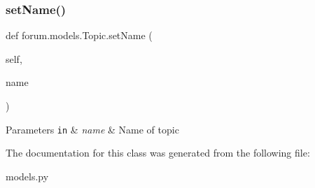 \subsubsection{\texorpdfstring{set\+Name()}{setName()}}
{\footnotesize\ttfamily def forum.\+models.\+Topic.\+set\+Name (\begin{DoxyParamCaption}\item[{}]{self,  }\item[{}]{name }\end{DoxyParamCaption})}


\begin{DoxyParams}[1]{Parameters}
\mbox{\tt in}  & {\em name} & Name of topic \\
\hline
\end{DoxyParams}


The documentation for this class was generated from the following file\+:\begin{DoxyCompactItemize}
\item 
models.\+py\end{DoxyCompactItemize}
